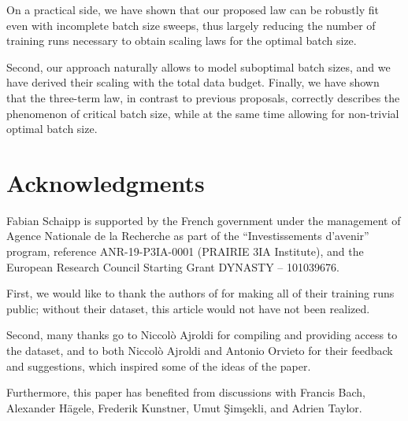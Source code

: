 \documentclass[12pt,a4paper,twoside]{article}
\begin{document}
On a practical side, we have shown that our proposed law can be robustly fit even with incomplete batch size sweeps, thus largely reducing the number of training runs necessary to obtain scaling laws for the optimal batch size.

Second, our approach naturally allows to model suboptimal batch sizes, and we have derived their scaling with the total data budget. Finally, we have shown that the three-term law, in contrast to previous proposals, correctly describes the phenomenon of critical batch size, while at the same time allowing for non-trivial optimal batch size.


\section*{Acknowledgments}

Fabian Schaipp is supported by the French government under the
management of Agence Nationale de la Recherche as part of the “Investissements d’avenir” program,
reference ANR-19-P3IA-0001 (PRAIRIE 3IA Institute), and the
European Research Council Starting Grant DYNASTY – 101039676.

First, we would like to thank the authors of \citet{Li2025} for making all of their training runs public; without their dataset, this article would not have not been realized.

Second, many thanks go to Niccol\`{o} Ajroldi for compiling and providing access to the \oellm{} dataset, and to both Niccol\`{o} Ajroldi and Antonio Orvieto for their feedback and suggestions, which inspired some of the ideas of the paper.

Furthermore, this paper has benefited from discussions with Francis Bach, Alexander H\"{a}gele, Frederik Kunstner, Umut \c{S}im\c{s}ekli, and Adrien Taylor.



\clearpage

\appendix


\end{document}
